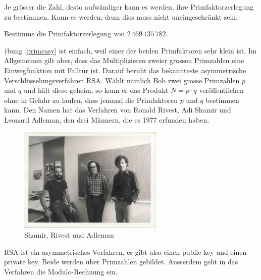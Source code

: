 \documentclass[%
11pt,%
twoside,%
titlepage,%
german,%
headsepline%
]{scrartcl}
\begin{document}
Je grösser die Zahl, desto aufwändiger kann es werden, ihre Primfaktorzerlegung zu bestimmen. Kann es werden, denn dies muss nicht uneingeschränkt sein.
\begin{ueb}\label{primeasy}
Bestimme die Primfaktorzerlegung von $2\,469\,135\,782$.
\end{ueb}
†bung \ref{primeasy} ist einfach, weil einer der beiden Primfaktoren sehr klein ist. Im Allgemeinen gilt aber, dass das Multiplizieren zweier grossen Primzahlen eine Einwegfunktion mit Falltür ist.
Darauf beruht das bekannteste asymmetrische Verschlüsselungsverfahren RSA. Wählt nämlich Bob zwei grosse Primzahlen $p$ und $q$ und hält diese geheim, so kann er das Produkt $N=p\cdot q$ veröffentlichen ohne in Gefahr zu laufen, dass jemand die Primfaktoren $p$ und $q$ bestimmen kann.
Den Namen hat das Verfahren von Ronald Rivest, Adi Shamir und Leonard Adleman, den drei Männern, die es 1977 erfunden haben.
\begin{figure}
\begin{center}
\includegraphics[width=0.618\textwidth]{pictures/rsaleute}
\end{center}
\caption{Shamir, Rivest und Adleman}
\end{figure}
RSA ist ein asymmetrisches Verfahren, es gibt also einen public key und einen private key. Beide werden über Primzahlen gebildet. Ausserdem geht in das Verfahren die Modulo-Rechnung ein.
\end{document}
